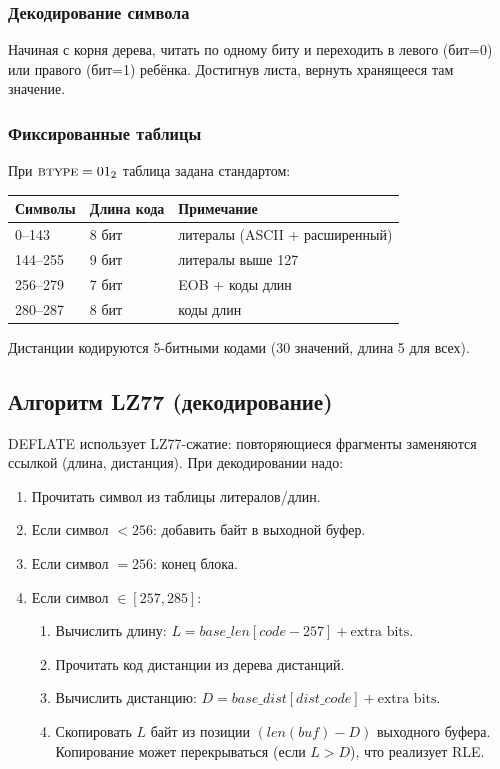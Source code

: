 \documentclass[12pt,a4paper]{article}
\begin{document}
\subsubsection{Декодирование символа}

Начиная с корня дерева, читать по одному биту и переходить
в левого (бит=0) или правого (бит=1) ребёнка. Достигнув листа,
вернуть хранящееся там значение.

\subsubsection{Фиксированные таблицы}
\label{sec:fixed}

При $\textsc{btype}=01_2$ таблица задана стандартом:

\begin{center}
\begin{tabular}{lll}
\toprule
Символы & Длина кода & Примечание \\
\midrule
0--143   & 8 бит & литералы (ASCII + расширенный) \\
144--255 & 9 бит & литералы выше 127 \\
256--279 & 7 бит & EOB + коды длин \\
280--287 & 8 бит & коды длин \\
\bottomrule
\end{tabular}
\end{center}

Дистанции кодируются 5-битными кодами (30 значений, длина 5 для всех).

\subsection{Алгоритм LZ77 (декодирование)}

DEFLATE использует LZ77-сжатие: повторяющиеся фрагменты заменяются
ссылкой (длина, дистанция). При декодировании надо:

\begin{enumerate}
  \item Прочитать символ из таблицы литералов/длин.
  \item Если символ $< 256$: добавить байт в выходной буфер.
  \item Если символ $= 256$: конец блока.
  \item Если символ $\in [257, 285]$:
    \begin{enumerate}
      \item Вычислить длину: $L = base\_len[code-257] + \text{extra bits}$.
      \item Прочитать код дистанции из дерева дистанций.
      \item Вычислить дистанцию: $D = base\_dist[dist\_code] + \text{extra bits}$.
      \item Скопировать $L$ байт из позиции $(len(buf) - D)$ выходного буфера.
            Копирование может перекрываться (если $L > D$), что реализует RLE.
    \end{enumerate}
\end{enumerate}
\end{document}
